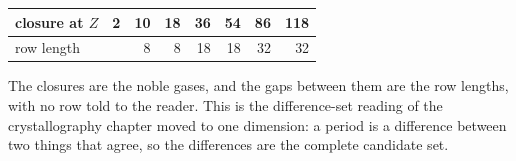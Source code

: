 \begin{center}
\begin{tabular}{@{}lrrrrrrr@{}}
\toprule
closure at $Z$ & 2 & 10 & 18 & 36 & 54 & 86 & 118 \\
\midrule
row length     &   & 8  & 8  & 18 & 18 & 32 & 32 \\
\bottomrule
\end{tabular}
\end{center}

\noindent The closures are the noble gases, and the gaps between them are the row lengths, with no row
told to the reader. This is the difference-set reading of the crystallography chapter moved to one
dimension: a period is a difference between two things that agree, so the differences are the complete
candidate set.
